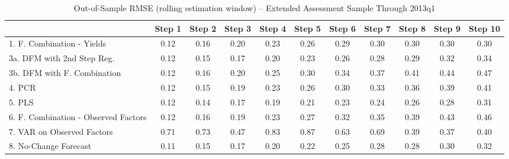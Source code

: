 \documentclass[11pt]{article}
\begin{document}
\begin{table}     
\caption{Out-of-Sample RMSE (rolling estimation window) -- Extended Assessment Sample Through 2013q1}                                                                  
\center                                                                                            
\begin{tabular}{|l|c|c|c|c|c|c|c|c|c|c|}                                                
\hline                                                                                  
&Step 1 &Step 2 &Step 3 &Step 4 &Step 5 &Step 6 &Step 7 &Step 8 &Step 9 &Step 10\\      
\hline                                                                                  
1. F. Combination - Yields          &0.12&0.16&0.20&0.23&0.26&0.29&0.30&0.30&0.30&0.30\\
3a. DFM with 2nd Step Reg.          &0.12&0.15&0.17&0.20&0.23&0.26&0.28&0.29&0.32&0.34\\
3b. DFM with F. Combination         &0.12&0.16&0.20&0.25&0.30&0.34&0.37&0.41&0.44&0.47\\
4. PCR                              &0.12&0.15&0.19&0.23&0.26&0.30&0.33&0.36&0.39&0.41\\
5. PLS                              &0.12&0.14&0.17&0.19&0.21&0.23&0.24&0.26&0.28&0.31\\
6. F. Combination - Observed Factors&0.12&0.16&0.19&0.23&0.27&0.32&0.35&0.39&0.43&0.46\\
7. VAR on Observed Factors          &0.71&0.73&0.47&0.83&0.87&0.63&0.69&0.39&0.37&0.40\\
8. No-Change Forecast               &0.11&0.15&0.17&0.20&0.22&0.25&0.28&0.28&0.30&0.32\\
\hline                                                                                  
\end{tabular}                                                                               
\end{table}                                                                                        
\end{document}
